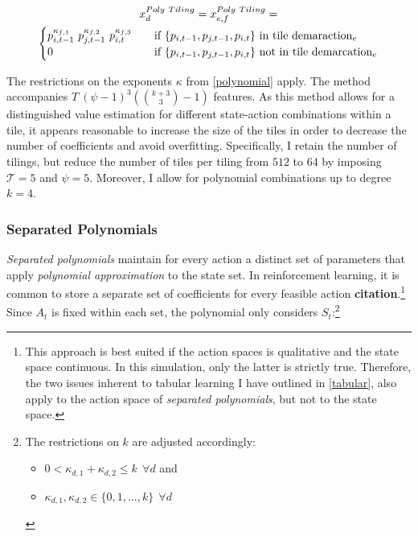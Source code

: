 \begin{gather}\label{poly_tiling_extraction}
x_d^{Poly~Tiling} = x_{e,f}^{Poly~Tiling} = \notag \\
\begin{cases}
p_{i, t-1}^{\kappa_{f,1}} ~ p_{j, t-1}^{\kappa_{f,2}} ~ p_{i, t}^{\kappa_{f,3}} & \quad \text{if } \{p_{i, t-1}, p_{j, t-1}, p_{i, t}\} \text{~in tile demaraction}_e  \\
0 & \quad \text{if } \{p_{i, t-1}, p_{j, t-1}, p_{i, t}\} \text{~not in tile demarcation}_e \\ \end{cases} 
\end{gather}

The restrictions on the exponents $\kappa$ from \autoref{polynomial} apply. The method accompanies $T~(\psi - 1)^3 ({k + 3\choose3}  - 1)$ features. As this method allows for a distinguished value estimation for different state-action combinations within a tile, it appears reasonable to increase the size of the tiles in order to decrease the number of coefficients and avoid overfitting. Specifically, I retain the number of tilings, but reduce the number of tiles per tiling from $512$ to $64$ by imposing $\mathcal{T} = 5$ and $\psi = 5$. Moreover, I allow for polynomial combinations up to degree $k=4$.

\subsubsection{Separated Polynomials}

\emph{Separated polynomials} maintain for every action a distinct set of parameters that apply \emph{polynomial approximation} to the state set. In reinforcement learning, it is common to store a separate set of coefficients for every feasible action \textbf{citation}.\footnote{This approach is best suited if the action spaces is qualitative and the state space continuous. In this simulation, only the latter is strictly true. Therefore, the two issues inherent to tabular learning I have outlined in \autoref{tabular}, also apply to the action space of \emph{separated polynomials}, but not to the state space.} Since $A_t$ is fixed within each set, the polynomial only considers $S_t$:\footnote{The restrictions on $k$ are adjusted accordingly:
	\begin{itemize}
		\item $0 < \kappa_{d,1} + \kappa_{d,2}  \leq k  ~~ \forall d$ and
		\item $\kappa_{d,1}, \kappa_{d,2} \in \{0, 1, ..., k\} ~~  \forall d$
	\end{itemize}
}


